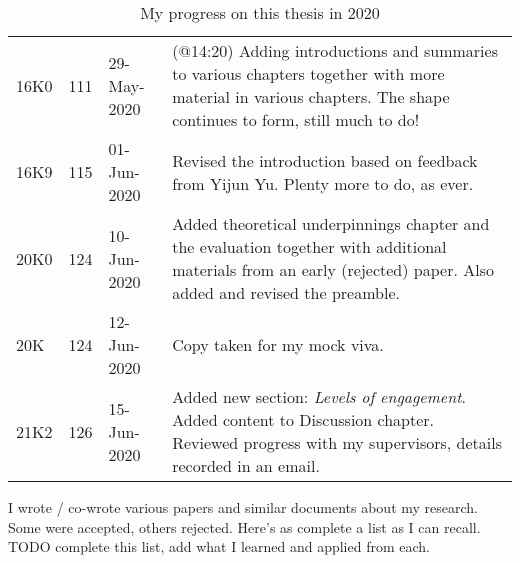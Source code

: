 \begin{table}[htpb]
\begin{adjustbox}{width=\textwidth}
\begin{tabular}{p{}p{}p{}p{}}
         16K0 &111 &29-May-2020 &(@14:20) Adding introductions and summaries to various chapters together with more material in various chapters. The shape continues to form, still much to do!\\
         16K9 &115 &01-Jun-2020 &Revised the introduction based on feedback from Yijun Yu. Plenty more to do, as ever.\\
         20K0 &124 &10-Jun-2020 &Added theoretical underpinnings chapter and the evaluation together with additional materials from an early (rejected) paper. Also added and revised the preamble.\\
         20K  &124 &12-Jun-2020 &Copy taken for my mock viva.\\
         21K2 &126 &15-Jun-2020 &Added new section: \emph{Levels of engagement}. Added content to Discussion chapter. Reviewed progress with my supervisors, details recorded in an email.\\
         
    \end{tabular}
    \end{adjustbox}
    \caption{My progress on this thesis in 2020}
    \label{tab:my_progress_on_this_thesis_2020}
\end{table}

I wrote / co-wrote various papers and similar documents about my research. Some were accepted, others rejected. Here's as complete a list as I can recall. TODO complete this list, add what I learned and applied from each.

